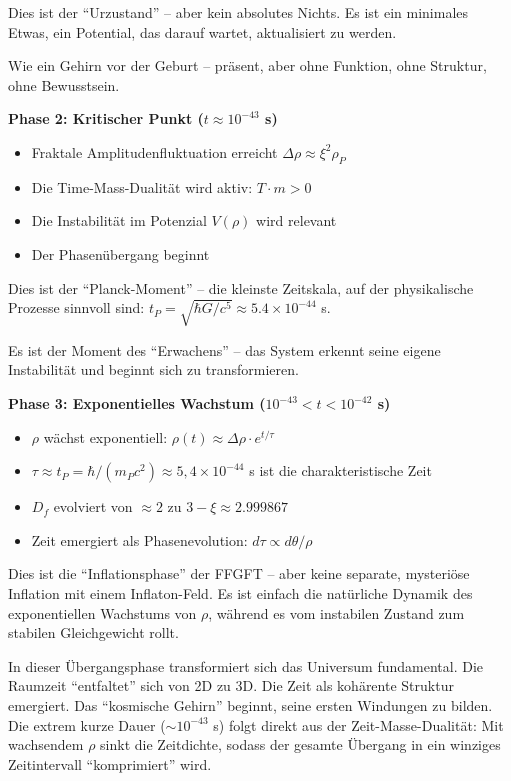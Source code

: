 	Dies ist der \enquote{Urzustand} -- aber kein absolutes Nichts. Es ist ein minimales Etwas, ein Potential, das darauf wartet, aktualisiert zu werden.
	
	Wie ein Gehirn vor der Geburt -- präsent, aber ohne Funktion, ohne Struktur, ohne Bewusstsein.
	
	\textbf{Phase 2: Kritischer Punkt ($t \approx 10^{-43}$ s)}
	
	\begin{itemize}[leftmargin=*]
		\item Fraktale Amplitudenfluktuation erreicht $\Delta\rho \approx \xi^2\rho_P$
		\item Die Time-Mass-Dualität wird aktiv: $T \cdot m > 0$
		\item Die Instabilität im Potenzial $V(\rho)$ wird relevant
		\item Der Phasenübergang beginnt
	\end{itemize}
	
	Dies ist der \enquote{Planck-Moment} -- die kleinste Zeitskala, auf der physikalische Prozesse sinnvoll sind: $t_P = \sqrt{\hbar G/c^5} \approx 5.4 \times 10^{-44}$ s.
	
	Es ist der Moment des \enquote{Erwachens} -- das System erkennt seine eigene Instabilität und beginnt sich zu transformieren.
	
	\textbf{Phase 3: Exponentielles Wachstum ($10^{-43} < t < 10^{-42}$ s)}
	
	\begin{itemize}[leftmargin=*]
		\item $\rho$ wächst exponentiell: $\rho(t) \approx \Delta\rho \cdot e^{t/\tau}$
		\item $\tau \approx t_P = \hbar/(m_P c^2) \approx 5{,}4 \times 10^{-44}$ s ist die charakteristische Zeit
		\item $D_f$ evolviert von $\approx 2$ zu $3-\xi \approx 2.999867$
		\item Zeit emergiert als Phasenevolution: $d\tau \propto d\theta/\rho$
	\end{itemize}
	
	Dies ist die \enquote{Inflationsphase} der FFGFT -- aber keine separate, mysteriöse Inflation mit einem Inflaton-Feld. Es ist einfach die natürliche Dynamik des exponentiellen Wachstums von $\rho$, während es vom instabilen Zustand zum stabilen Gleichgewicht rollt.
	
	In dieser Übergangsphase transformiert sich das Universum fundamental. Die Raumzeit \enquote{entfaltet} sich von 2D zu 3D. Die Zeit als kohärente Struktur emergiert. Das \enquote{kosmische Gehirn} beginnt, seine ersten Windungen zu bilden. Die extrem kurze Dauer ($\sim 10^{-43}$ s) folgt direkt aus der Zeit-Masse-Dualität: Mit wachsendem $\rho$ sinkt die Zeitdichte, sodass der gesamte Übergang in ein winziges Zeitintervall \enquote{komprimiert} wird.
	
